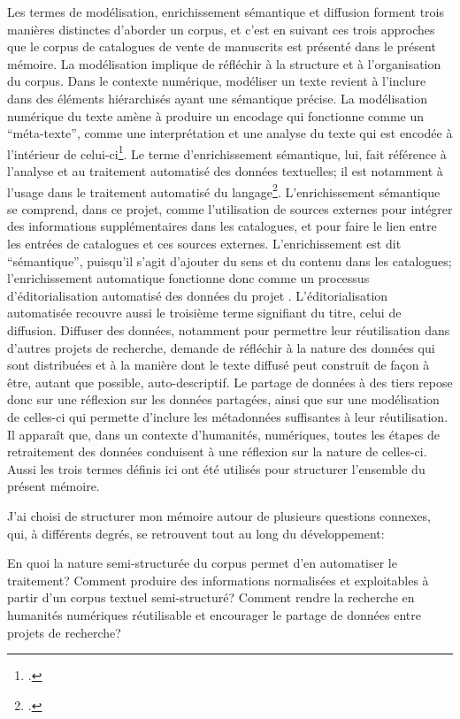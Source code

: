 Les termes de modélisation, enrichissement sémantique et diffusion forment trois manières distinctes d'aborder un corpus, et c'est en suivant ces trois approches que le corpus de catalogues de vente de manuscrits est présenté dans le présent mémoire. La modélisation implique de réfléchir à la structure et à l'organisation du corpus. Dans le contexte numérique, modéliser un texte revient à l'inclure dans des éléments hiérarchisés ayant une sémantique précise. La modélisation numérique du texte amène à produire un encodage qui fonctionne comme un \enquote{méta-texte}, comme une interprétation et une analyse du texte qui est encodée à l'intérieur de celui-ci\footcite[p. 27]{flanders_gentle_2019}. Le terme d'enrichissement sémantique, lui, fait référence à l'analyse et au traitement automatisé des données textuelles; il est notamment à l'usage dans le traitement automatisé du langage\footcite{brando_evaluation_2016}. L'enrichissement sémantique se comprend, dans ce projet, comme l'utilisation de sources externes pour intégrer des informations supplémentaires dans les catalogues, et pour faire le lien entre les entrées de catalogues et ces sources externes. L'enrichissement est dit \enquote{sémantique}, puisqu'il s'agit d'ajouter du sens et du contenu dans les catalogues; l'enrichissement automatique fonctionne donc comme un processus d'éditorialisation automatisé des données du projet \mssktb{}. L'éditorialisation automatisée recouvre aussi le troisième terme signifiant du titre, celui de diffusion. Diffuser des données, notamment pour permettre leur réutilisation dans d'autres projets de recherche, demande de réfléchir à la nature des données qui sont distribuées et à la manière dont le texte diffusé peut construit de façon à être, autant que possible, auto-descriptif. Le partage de données à des tiers repose donc sur une réflexion sur les données partagées, ainsi que sur une modélisation de celles-ci qui permette d'inclure les métadonnées suffisantes à leur réutilisation. Il apparaît que, dans un contexte d'humanités, numériques, toutes les étapes de retraitement des données conduisent à une réflexion sur la nature de celles-ci. Aussi les trois termes définis ici ont été utilisés pour structurer l'ensemble du présent mémoire.

J'ai choisi de structurer mon mémoire autour de plusieurs questions connexes, qui, à différents degrés, se retrouvent tout au long du développement:

\begin{adjustwidth}{60pt}{60pt}
	En quoi la nature semi-structurée du corpus permet d'en automatiser le traitement? Comment produire des informations normalisées et exploitables à partir d'un corpus textuel semi-structuré? Comment rendre la recherche en humanités numériques réutilisable et encourager le partage de données entre projets de recherche?
\end{adjustwidth}

